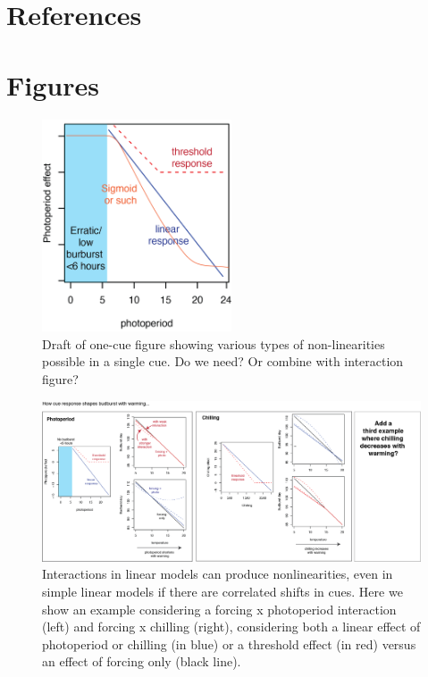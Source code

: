 \documentclass[11pt,letter]{article}
\begin{document}
\clearpage

\section{References}


\clearpage

\section{Figures}

\begin{figure}
\centering
\includegraphics[width=0.5\textwidth]{figures/limcues_nonlin_onecue.png}
\caption{Draft of one-cue figure showing various types of non-linearities possible in a single cue. Do we need? Or combine with interaction figure?}
  \label{fig:onecue}
\end{figure}

\clearpage
\begin{figure}
\centering
\includegraphics[width=1\textwidth]{figures/limcues_intxns.png}
\caption{Interactions in linear models can produce nonlinearities, even in simple linear models if there are correlated shifts in cues. Here we show an example considering a forcing x photoperiod interaction (left) and forcing x chilling (right), considering both a linear effect of photoperiod or chilling (in blue) or a threshold effect (in red) versus an effect of forcing only (black line).}
  \label{fig:intxncues}
\end{figure}
\end{document}

